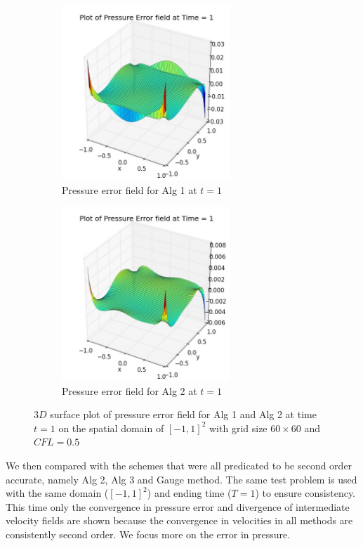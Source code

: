 \begin{figure}[H]
	\centering
	\begin{subfigure}[t]{2.5in}
		\centering
		\includegraphics[width=2.5in]{figures/Pm1a_pf2_P_error_t_1_grid_60_cfl_0_1.jpg}
		\caption{Pressure error field for Alg 1 at $t=1$ }\label{fig:6.2a}		
	\end{subfigure}
	\quad
	\begin{subfigure}[t]{2.5in}
		\centering
		\includegraphics[width=2.5in]{figures/Pm1b_pf2_P_error_t_1_grid_60_cfl_0_1.jpg}
		\caption{Pressure error field for Alg 2 at $t=1$}\label{fig:6.2b}
	\end{subfigure}
	\caption{$3D$ surface plot of pressure error field for Alg 1 and Alg 2 at time $t=1$ on the spatial domain of $[-1,1]^2$ with grid size $60 \times 60$ and $CFL=0.5$}\label{fig:6.2}
\end{figure}

We then compared with the schemes that were all predicated to be second order accurate, namely Alg 2, Alg 3 and Gauge method. The same test problem is used with the same domain ($[-1,1]^2$) and ending time ($T=1$) to ensure consistency. This time only the convergence in pressure error and divergence of intermediate velocity fields are shown because the convergence in velocities in all methods are consistently second order. We focus more on the error in pressure.\\

